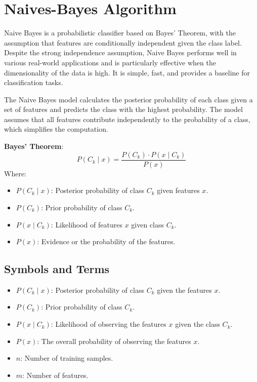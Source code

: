 \documentclass[10pt,conference,compsoc]{IEEEtran}
\begin{document}
{\section{Naives-Bayes Algorithm}
Naive Bayes is a probabilistic classifier based on Bayes' Theorem, with the assumption that features are conditionally independent given the class label. Despite the strong independence assumption, Naive Bayes performs well in various real-world applications and is particularly effective when the dimensionality of the data is high. It is simple, fast, and provides a baseline for classification tasks.

The Naive Bayes model calculates the posterior probability of each class given a set of features and predicts the class with the highest probability. The model assumes that all features contribute independently to the probability of a class, which simplifies the computation.

\textbf{Bayes' Theorem}:
\[
P(C_k \mid x) = \frac{P(C_k) \cdot P(x \mid C_k)}{P(x)}
\]
Where:
\begin{itemize}
    \item \( P(C_k \mid x) \): Posterior probability of class \( C_k \) given features \( x \).
    \item \( P(C_k) \): Prior probability of class \( C_k \).
    \item \( P(x \mid C_k) \): Likelihood of features \( x \) given class \( C_k \).
    \item \( P(x) \): Evidence or the probability of the features.
\end{itemize}

\subsection{Symbols and Terms}
\begin{itemize}
    \item \( P(C_k \mid x) \): Posterior probability of class \( C_k \) given the features \( x \).
    \item \( P(C_k) \): Prior probability of class \( C_k \).
    \item \( P(x \mid C_k) \): Likelihood of observing the features \( x \) given the class \( C_k \).
    \item \( P(x) \): The overall probability of observing the features \( x \).
    \item \( n \): Number of training samples.
    \item \( m \): Number of features.
\end{itemize}

}
\end{document}
